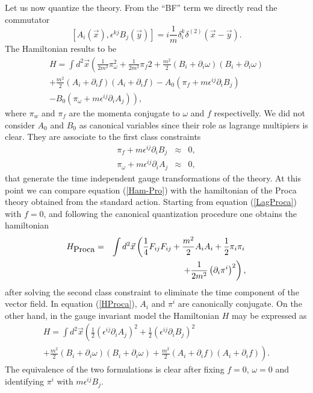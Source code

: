 \documentclass[a4paper,12pt]{article}
\newcommand{\eref}[1]{(\ref{#1})}
\renewcommand{\sup}[1]{^{(#1)}}
\newcommand{\dxy}{\delta\sup 2(\vec x-\vec y)}
\begin{document}
Let us now quantize the theory. From the ``BF'' term  we directly read the
commutator\cite{Faddeev-Jackiw}
\begin{equation}
\left[A_i(\vec x),\epsilon^{kj}B_j(\vec y)\right]=i\frac 1{m}\delta_i^k\dxy.
\end{equation}
The Hamiltonian results to be
\begin{eqnarray}
H=\int d^2\vec x\left(\frac 1{2m^2}\pi_\omega^2+\frac 1{2m^2}\pi_f2+
\frac {m^2}2(B_i+\partial_i\omega)(B_i+\partial_i\omega)\right.
\nonumber\\
    +\frac{m^2}2(A_i+\partial_i f)(A_i+\partial_i f)
-A_0\left(\pi_f+m\epsilon^{ij}\partial_i B_j\right)\nonumber\\
\left.-B_0\left(\pi_\omega+m\epsilon^{ij}
\partial_i A_j\right)\right),\label{Ham-Pro}
\end{eqnarray}
where $\pi_w$ and $\pi_f$ are the momenta conjugate to $\omega$ and $f$
respectivelly. We did not consider $A_0$ and $B_0$ as canonical variables since
their role as lagrange multipiers is clear. They are associate to the first
class constraints
\begin{eqnarray}
\pi_f+m\epsilon^{ij}\partial_i B_j&\approx&0,\label{v1}\\
\pi_\omega+m\epsilon^{ij}\partial_i A_j&\approx&0,\label{v2}
\end{eqnarray}
that generate the time independent gauge transformations of the
theory. At this point we can compare equation \eref{Ham-Pro} with
the hamiltonian of the Proca theory obtained from the standard
action. Starting from equation \eref{LagProca} with $f=0$, and
following the canonical quantization procedure one obtains the
hamiltonian
\begin{eqnarray}
H_{\hbox{Proca}}&=&\int d^2\vec x\left(\frac 14F_{ij}F_{ij}+
\frac{m^2}2A_iA_i+\frac 12\pi_i\pi_i\right.\nonumber\\
&&\qquad\qquad\qquad\left.+{\frac1{2m^2}}
\left(\partial_i\pi^i\right)^2\right)\label{HProca},
\end{eqnarray}
after solving the second class constraint to eliminate the time component of
the vector field. In equation \eref{HProca}, $A_i$ and $\pi^i$ are
canonically conjugate. On the other hand, in the gauge invariant model
the Hamiltonian $H$ may be expressed as
\begin{eqnarray}
H=\int d^2\vec x\left(\frac 12\left(\epsilon^{ij}\partial_iA_j\right)^2+
\frac 12\left(\epsilon^{ij}\partial_iB_j\right)^2\right.\nonumber\\
\left.+\frac {m^2}2\left(B_i+\partial_i\omega\right)
\left(B_i+\partial_i\omega\right)+
\frac{m^2}2\left(A_i+\partial_i f\right)\left(A_i+\partial_i f\right)\right).
\end{eqnarray}
The equivalence of the two formulations is clear after fixing $f=0$, $\omega=0$
and identifying $\pi^i$ with $m\epsilon^{ij}B_j$.
\end{document}
